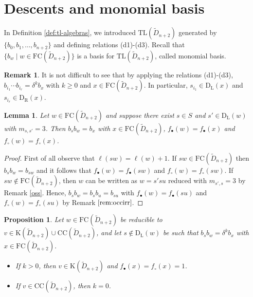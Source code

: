 \documentclass{amsart}
\newcommand{\D}{{\widetilde{D}_{n+2}}}
\newcommand{\ld}{{\mathrm{D}_{\mathrm{L}}}}
\newcommand{\rd}{{\mathrm{D}_{\mathrm{R}}}}
\newcommand{\tl}{{\mathrm{TL}}}
\newcommand{\fc}{{\mathrm{FC}}}
\newcommand{\TTC}{\mathrm{CC}}
\newcommand{\car}{\mathrm{K}}
\newtheorem{Lemma}[Theorem]{Lemma}
\newtheorem{Proposition}[Theorem]{Proposition}
\theoremstyle{definition}
\newtheorem{Remark}[Theorem]{Remark}
\begin{document}
\section{Descents and monomial basis}\label{sec:descents}
In Definition \ref{def:tl-algebras}, we introduced $\tl(\D)$ generated by $\{b_0, b_1, \ldots, b_{n+2}\}$ and defining relations (d1)-(d3). Recall that $\{b_w\mid w\in \fc(\D)\}$ is a basis for $\tl(\D)$, called monomial basis.


\begin{Remark}
\label{remark:tlalgebra}
It is not difficult to see that by applying the relations (d1)-(d3), $b_{{i_1}}\cdots b_{{i_r}}=\delta^k b_x$ with $k\ge 0$ and $x\in \fc(\D)$. In particular, $s_{i_1}\in \ld(x)$ and $s_{i_r}\in \rd(x)$.
\end{Remark}



\begin{Lemma}
\label{nuovoprel}
Let $w\in \fc(\D)$ and suppose there exist $s\in S$ and $s'\in \ld(w)$ with $m_{s,s'}=3$. Then $b_sb_w=b_x$ with $x\in \fc(\D)$, $f_\bullet(w)=f_\bullet(x)$ and $f_\circ(w)=f_\circ(x)$.
\end{Lemma}

\begin{proof}
First of all observe that $\ell(sw)= \ell(w)+1$. If $sw\in \fc(\D)$ then $b_sb_w=b_{sw}$ and it follows that $f_\bullet(w)=f_\bullet(sw)$ and $f_\circ(w)=f_\circ(sw)$. If $sw\notin \fc(\D)$, then $w$ can be written as $w=s'su$ reduced with $m_{s',s}=3$ by Remark \ref{oss}. Hence, $b_sb_w=b_{s}b_u=b_{su}$ with $f_\bullet(w)=f_\bullet(su)$ and $f_\circ(w)=f_\circ(su)$ by Remark $\ref{rem:occirr}$.
\end{proof}



\begin{Proposition}
\label{nuovodue}
Let $w\in \fc(\D)$ be reducible to $v\in \car(\D)\cup \TTC(\D)$, and let $s\notin \ld(w)$ be such that $b_sb_w=\delta ^kb_{x}$ with $x\in \fc(\D)$. 
\begin{itemize}
    \item[(a)] If $k>0$, then $v\in \car(\D)$ and $f_\bullet(x)=f_\circ(x)=1$.
    \item[(b)] If $v\in \TTC(\D)$, then $k=0$.
\end{itemize}
\end{Proposition}
\end{document}
